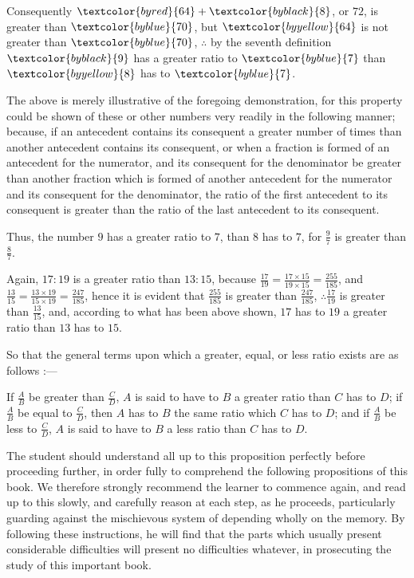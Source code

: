 \documentclass[booklanguage=english]{byrnebook}
\begin{document}
Consequently $\textcolor{byred}{64} + \textcolor{byblack}{8}$, or $72$, is greater than $\textcolor{byblue}{70}$, but $\textcolor{byyellow}{64}$ is not greater than $\textcolor{byblue}{70}$, $\therefore$ by the seventh definition $\textcolor{byblack}{9}$ has a greater ratio to $\textcolor{byblue}{7}$ than $\textcolor{byyellow}{8}$ has to $\textcolor{byblue}{7}$.

The above is merely illustrative of the foregoing demonstration, for this property could be shown of these or other numbers very readily in the following manner; because, if an antecedent contains its consequent a greater number of times than another antecedent contains its consequent, or when a fraction is formed of an antecedent for the numerator, and its consequent for the denominator be greater than another fraction which is formed of another antecedent for the numerator and its consequent for the denominator, the ratio of the first antecedent to its consequent is greater than the ratio of the last antecedent to its consequent.

Thus, the number $9$ has a greater ratio to $7$, than $8$ has to $7$, for $\frac{9}{7}$ is greater than $\frac{8}{7}$.

Again, $17 : 19$ is a greater ratio than $13 : 15$, because $\frac{17}{19} = \frac{17 \times 15}{19 \times 15} = \frac{255}{185}$, and $\frac{13}{15} = \frac{13 \times 19}{15 \times 19} = \frac{247}{185}$, hence it is evident that $\frac{255}{185}$ is greater than $\frac{247}{185}$, $\therefore \frac{17}{19}$ is greater than $\frac{13}{15}$, and, according to what has been above shown, $17$ has to $19$ a greater ratio than $13$ has to $15$.

So that the general terms upon which a greater, equal, or less ratio exists are as follows :—

If $\frac{A}{B}$ be greater than $\frac{C}{D}$, $A$ is said to have to $B$ a greater ratio than $C$ has to $D$; if $\frac{A}{B}$ be equal to $\frac{C}{D}$, then $A$ has to $B$ the same ratio which $C$ has to $D$; and if $\frac{A}{B}$ be less to $\frac{C}{D}$, $A$ is said to have to $B$ a less ratio than $C$ has to $D$.

The student should understand all up to this proposition perfectly before proceeding further, in order fully to comprehend the following propositions of this book. We therefore strongly recommend the learner to commence again, and read up to this slowly, and carefully reason at each step, as he proceeds, particularly guarding against the mischievous system of depending wholly on the memory. By following these instructions, he will find that the parts which usually present considerable difficulties will present no difficulties whatever, in prosecuting the study of this important book.
\end{document}
